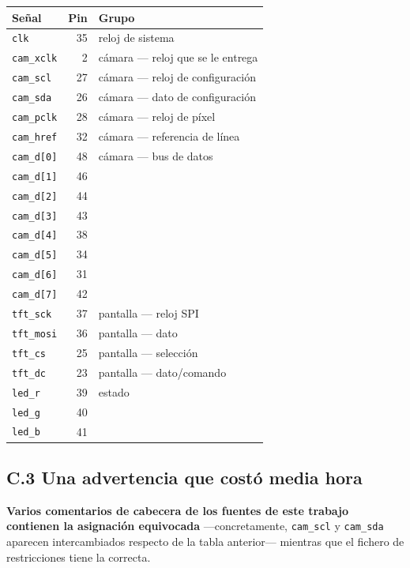 \begin{longtable}[]{@{}lrl@{}}
\toprule\noalign{}
Señal & Pin & Grupo \\
\midrule\noalign{}
\endhead
\bottomrule\noalign{}
\endlastfoot
\texttt{clk} & 35 & reloj de sistema \\
\texttt{cam\_xclk} & 2 & cámara --- reloj que se le entrega \\
\texttt{cam\_scl} & 27 & cámara --- reloj de configuración \\
\texttt{cam\_sda} & 26 & cámara --- dato de configuración \\
\texttt{cam\_pclk} & 28 & cámara --- reloj de píxel \\
\texttt{cam\_href} & 32 & cámara --- referencia de línea \\
\texttt{cam\_d{[}0{]}} & 48 & cámara --- bus de datos \\
\texttt{cam\_d{[}1{]}} & 46 & \\
\texttt{cam\_d{[}2{]}} & 44 & \\
\texttt{cam\_d{[}3{]}} & 43 & \\
\texttt{cam\_d{[}4{]}} & 38 & \\
\texttt{cam\_d{[}5{]}} & 34 & \\
\texttt{cam\_d{[}6{]}} & 31 & \\
\texttt{cam\_d{[}7{]}} & 42 & \\
\texttt{tft\_sck} & 37 & pantalla --- reloj SPI \\
\texttt{tft\_mosi} & 36 & pantalla --- dato \\
\texttt{tft\_cs} & 25 & pantalla --- selección \\
\texttt{tft\_dc} & 23 & pantalla --- dato/comando \\
\texttt{led\_r} & 39 & estado \\
\texttt{led\_g} & 40 & \\
\texttt{led\_b} & 41 & \\
\end{longtable}

\subsection{C.3 Una advertencia que costó media
hora}\label{c.3-una-advertencia-que-costuxf3-media-hora}

\textbf{Varios comentarios de cabecera de los fuentes de este trabajo
contienen la asignación equivocada} ---concretamente, \texttt{cam\_scl}
y \texttt{cam\_sda} aparecen intercambiados respecto de la tabla
anterior--- mientras que el fichero de restricciones tiene la correcta.

